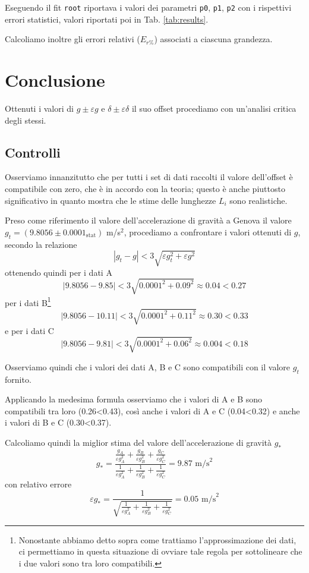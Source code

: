 \documentclass[italian, a4paper, 10pt, twocolumn]{../../style/lab_unige}
\newcommand{\reftab}[1]{Tab. {\ref{#1}}}%
\begin{document}
  Eseguendo il fit \verb|root| riportava i valori dei parametri \verb|p0|, \verb|p1|, \verb|p2| con i
  rispettivi errori statistici, valori riportati poi in \reftab{tab:results}.

  Calcoliamo inoltre gli errori relativi ($E_{r\%}$) associati a ciascuna grandezza.

  \section{Conclusione}
  Ottenuti i valori di $g\pm\varepsilon g$ e $\delta\pm\varepsilon\delta$ il suo offset procediamo con
  un'analisi critica degli stessi. 

  \subsection{Controlli}

  Osserviamo innanzitutto che per tutti i set di dati raccolti il valore dell'offset è compatibile con zero, 
  che è in accordo con la teoria; questo è anche piuttosto significativo in quanto mostra che le stime delle 
  lunghezze $L_{i}$ sono realistiche.

  Preso come riferimento il valore dell'accelerazione di gravità a Genova il valore 
  $g_{t}=(9.8056\pm0.0001_{\text{stat}})$ m/s$^{2}$, procediamo a confrontare i valori ottenuti di $g$,
  secondo la relazione
  \[
    \left|g_{t}-g\right|<3\sqrt{\varepsilon g_{t}^{2}+\varepsilon g^{2}}
  \]
  ottenendo quindi per i dati A
  \[\left|9.8056-9.85\right|<3\sqrt{0.0001^{2}+0.09^{2}}\approx0.04<0.27\]
  per i dati B\footnote{Nonostante abbiamo detto sopra come trattiamo l'approssimazione dei dati, ci permettiamo
  in questa situazione di ovviare tale regola per sottolineare che i due valori sono tra loro compatibili.}
  \[\left|9.8056-10.11\right|<3\sqrt{0.0001^{2}+0.11^{2}}\approx0.30<0.33\]
  e per i dati C
  \[\left|9.8056-9.81\right|<3\sqrt{0.0001^{2}+0.06^{2}}\approx0.004<0.18\]

  Osserviamo quindi che i valori dei dati A, B e C sono compatibili con il valore $g_{t}$ fornito.

  Applicando la medesima formula osserviamo che i valori di A e B sono compatibili tra loro (0.26<0.43),
  così anche i valori di A e C (0.04<0.32) e anche i valori di B e C (0.30<0.37)\footnotemark[4].

  
  Calcoliamo quindi la miglior stima del valore dell'accelerazione di gravità $g_{*}$
  \[
    g_{*}=\frac{\frac{g_{A}}{\varepsilon g_{A}^{2}}+\frac{g_{B}}{\varepsilon g_{B}^{2}}+\frac{g_{C}}{\varepsilon g_{C}^{2}}}
    {\frac{1}{\varepsilon g_{A}^{2}}+\frac{1}{\varepsilon g_{B}^{2}}+\frac{1}{\varepsilon g_{C}^{2}}}=9.87 \text{ m/s}^{2}
  \]
  con relativo errore
  \[
    \varepsilon g_{*}=\frac{1}{\sqrt{\frac{1}{\varepsilon g_{A}^{2}}+\frac{1}{\varepsilon g_{B}^{2}}+\frac{1}{\varepsilon g_{C}^{2}}}}=0.05\text{ m/s}^{2}
  \]
\end{document}
